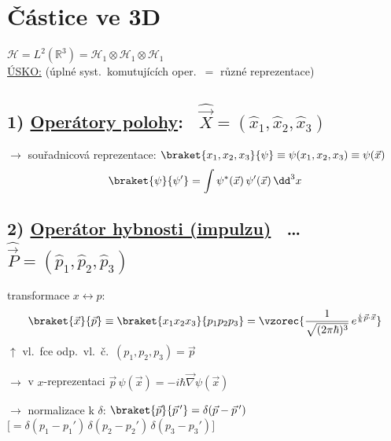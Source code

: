 \section{Částice ve 3D}

 \quad $\mathcal{H} = L^2(\mathbb{R}^3) = \mathcal{H}_1\otimes\mathcal{H}_1\otimes\mathcal{H}_1$ \\
\underline{ÚSKO:} \quad (úplné syst.\ komutujících oper.\ $=$ různé reprezentace)

\subsection*{1) \underline{Operátory polohy}: \ $\hat{\vec X} = (\hat x_1,\hat x_2,\hat x_3)$ \ }
$\to$ souřadnicová reprezentace: \quad $\braket{x_1,x_2,x_3}{\psi} \equiv \psi(x_1,x_2,x_3) \equiv \psi(\vec x)$
\[
  \braket{\psi}{\psi'} = \int\psi^*(\vec x)\,\psi'(\vec x)\,\dd^3x
\]

\subsection*{2) \underline{Operátor hybnosti (impulzu)} \ \dots\ $\hat{\vec P} = (\hat p_1,\hat p_2,\hat p_3)$ \ }
transformace $x\leftrightarrow p$:
\[
  \braket{\vec x}{\vec p} \equiv \braket{x_1x_2x_3}{p_1p_2p_3} = \vzorec{\frac{1}{\sqrt{(2\pi\hbar)^3}}\,e^{\frac{i}{\hbar}\vec p\cdot\vec x}}
\]
\hfill $\uparrow$ vl.\ fce odp.\ vl.\ č.\ $(p_1,p_2,p_3) = \vec p$

$\to$ v $x$-reprezentaci \quad $\vec p\,\psi(\vec x) = -i\hbar\vec\nabla\psi(\vec x)$

$\to$ normalizace k $\delta$: \quad $\braket{\vec p}{\vec p\,'} = \delta(\vec p - \vec p\,')$ \quad
$\big[= \delta(p_1 - p_1')\,\delta(p_2 - p_2')\,\delta(p_3 - p_3')\big]$

 \\
\hspace*{3cm}

